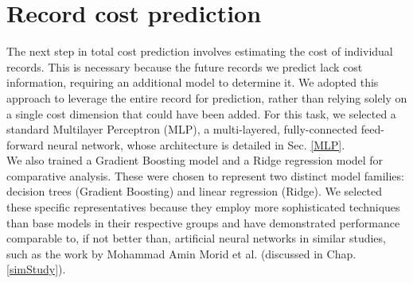 
\section{Record cost prediction}
\label{recCostPred}

The next step in total cost prediction involves estimating the cost of individual records. This is necessary because the future records we predict lack cost information, requiring an additional model to determine it. We adopted this approach to leverage the entire record for prediction, rather than relying solely on a single cost dimension that could have been added. For this task, we selected a standard Multilayer Perceptron (MLP), a multi-layered, fully-connected feed-forward neural network, whose architecture is detailed in Sec. \ref{MLP}.
\\

We also trained a Gradient Boosting model and a Ridge regression model for comparative analysis. These were chosen to represent two distinct model families: decision trees (Gradient Boosting) and linear regression (Ridge). We selected these specific representatives because they employ more sophisticated techniques than base models in their respective groups and have demonstrated performance comparable to, if not better than, artificial neural networks in similar studies, such as the work by Mohammad Amin Morid et al. \cite{morid2018supervised} (discussed in Chap. \ref{simStudy}).